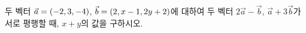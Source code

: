두 벡터 $\vec{a}=(-2{,}\mkern3mu\mathopen{}3{,}\mkern3mu\mathopen{}-4)$, $\vec{b}=(2{,}\mkern3mu\mathopen{}x-1{,}\mkern3mu\mathopen{}2y+2)$에 대하여 두 벡터 $2\vec{a}-\vec{b}$, $\vec{a}+3\vec{b}$가 서로 평행할 때, $x+y$의 값을 구하시오.
